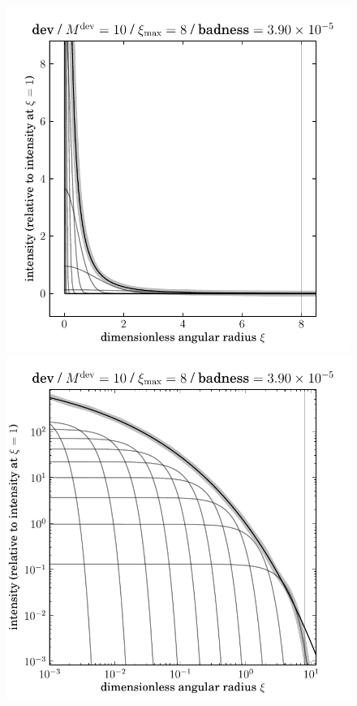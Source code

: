 \documentclass[12pt,pdftex,preprint]{aastex}
\newlength{\figurewidth}
\begin{document}
\clearpage
\begin{figure}
\includegraphics[width=\figurewidth]{dev_K10_MR08_profile.pdf}%
\includegraphics[width=\figurewidth]{dev_K10_MR08_profile_log.pdf}\\

\end{figure}
\end{document}
